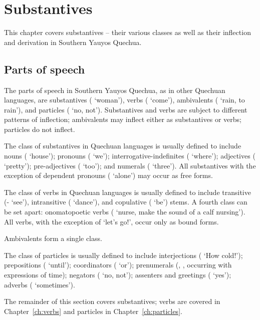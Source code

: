 \chapter{Substantives}\label{ch:substantives}
This chapter covers substantives -- their various classes as well as their inflection and derivation in Southern Yauyos Quechua.

\section{Parts of speech}
The parts of speech in Southern Yauyos Quechua, as in other Quechuan languages, are substantives ( `woman'), verbs ( `come'), ambivalents ( `rain, to rain'), and particles ( `no, not'). Substantives and verbs are subject to different patterns of inflection; ambivalents may inflect either as substantives or verbs; particles do not inflect.

The class of substantives in Quechuan languages is usually defined to include nouns ( `house'); pronouns ( `we'); interrogative-indefinites ( `where'); adjectives ( `pretty'); pre-adjectives ( `too'); and numerals ( `three'). All substantives with the exception of dependent pronouns ( `alone') may occur as free forms.

The class of verbs in Quechuan languages is usually defined to include transitive (- `see'), intransitive ( `dance'), and copulative ( `be') stems. A fourth class can be set apart: onomatopoetic verbs ( `nurse, make the sound of a calf nursing'). All verbs, with the exception of  `let's go!', occur only as bound forms.

Ambivalents form a single class.

The class of particles is usually defined to include interjections ( `How cold!'); prepositions ( `until'); coordinators ( `or'); prenumerals (, , occurring with expressions of time); negators ( `no, not'); assenters and greetings ( `yes'); adverbs ( `sometimes').

The remainder of this section covers substantives; verbs are covered in Chapter~\ref{ch:verbs} and particles in Chapter~\ref{ch:particles}.

